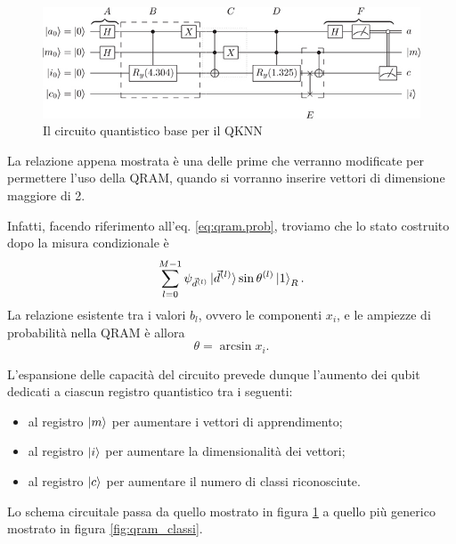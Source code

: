 \begin{figure}[h]
    \centering
    \includegraphics[width=\linewidth]{gfx/schuld_circuito}
    \caption{Il circuito quantistico base per il QKNN \cite{schuld}}
    \label{fig:circuito_schuld}
\end{figure}

La relazione appena mostrata è una delle prime che verranno modificate per permettere 
l'uso della \ac{QRAM}, quando si vorranno inserire vettori di dimensione maggiore di 2. 

Infatti, facendo riferimento all'eq. \ref{eq:qram.prob}, troviamo che lo stato costruito 
dopo la misura condizionale è 
\begin{equation}
    \sum_{l=0}^{M-1} \psi_{\vec{d}^{(l)}}\ket{\vec{d}^{(l)}}\sin\theta^{(l)}\ket{1}_R. 
\end{equation}
La relazione esistente tra i valori $b_l$, ovvero le componenti $x_i$, 
e le ampiezze di probabilità nella \ac{QRAM} è allora
\begin{equation} \label{eq:angolo.qram}
    \theta = \arcsin x_i. 
\end{equation}

L'espansione delle capacità del circuito prevede dunque l'aumento dei qubit 
dedicati a ciascun registro quantistico tra i seguenti: 
\begin{itemize}
    \item al registro $\ket{m}$ per aumentare i vettori di apprendimento; 
    \item al registro $\ket{i}$ per aumentare la dimensionalità dei vettori; 
    \item al registro $\ket{c}$ per aumentare il numero di classi riconosciute. 
\end{itemize}
Lo schema circuitale passa da quello mostrato in figura \ref{fig:circuito_schuld} a 
quello più generico mostrato in figura \ref{fig:qram_classi}. 

